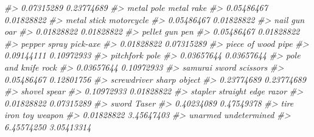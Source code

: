 \documentclass[
  12pt,
]{book}
\newenvironment{Shaded}{\begin{snugshade}}{\end{snugshade}}
\newcommand{\CommentTok}[1]{\textcolor[rgb]{0.56,0.35,0.01}{\textit{#1}}}
\begin{document}
\begin{Shaded}
\begin{Highlighting}[]
\CommentTok{\#>                       0.07315289                       0.23774689 }
\CommentTok{\#>                       metal pole                       metal rake }
\CommentTok{\#>                       0.05486467                       0.01828822 }
\CommentTok{\#>                      metal stick                       motorcycle }
\CommentTok{\#>                       0.05486467                       0.01828822 }
\CommentTok{\#>                         nail gun                              oar }
\CommentTok{\#>                       0.01828822                       0.01828822 }
\CommentTok{\#>                       pellet gun                              pen }
\CommentTok{\#>                       0.05486467                       0.01828822 }
\CommentTok{\#>                     pepper spray                         pick{-}axe }
\CommentTok{\#>                       0.01828822                       0.07315289 }
\CommentTok{\#>                    piece of wood                             pipe }
\CommentTok{\#>                       0.09144111                       0.10972933 }
\CommentTok{\#>                        pitchfork                             pole }
\CommentTok{\#>                       0.03657644                       0.03657644 }
\CommentTok{\#>                   pole and knife                             rock }
\CommentTok{\#>                       0.03657644                       0.10972933 }
\CommentTok{\#>                    samurai sword                         scissors }
\CommentTok{\#>                       0.05486467                       0.12801756 }
\CommentTok{\#>                      screwdriver                     sharp object }
\CommentTok{\#>                       0.23774689                       0.23774689 }
\CommentTok{\#>                           shovel                            spear }
\CommentTok{\#>                       0.10972933                       0.01828822 }
\CommentTok{\#>                          stapler              straight edge razor }
\CommentTok{\#>                       0.01828822                       0.07315289 }
\CommentTok{\#>                            sword                            Taser }
\CommentTok{\#>                       0.40234089                       0.47549378 }
\CommentTok{\#>                        tire iron                       toy weapon }
\CommentTok{\#>                       0.01828822                       3.45647403 }
\CommentTok{\#>                          unarmed                     undetermined }
\CommentTok{\#>                       6.45574250                       3.05413314 }

\end{Highlighting}
\end{Shaded}
\end{document}
